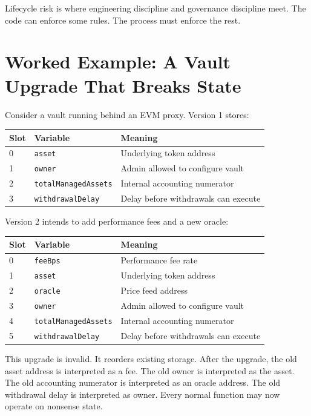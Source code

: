 Lifecycle risk is where engineering discipline and governance discipline meet. The code can enforce some rules. The process must enforce the rest.

\section{Worked Example: A Vault Upgrade That Breaks State}

Consider a vault running behind an EVM proxy. Version 1 stores:

\begin{center}
\begin{tabular}{@{}lll@{}}
\toprule
Slot & Variable & Meaning \\
\midrule
0 & \texttt{asset} & Underlying token address \\
1 & \texttt{owner} & Admin allowed to configure vault \\
2 & \texttt{totalManagedAssets} & Internal accounting numerator \\
3 & \texttt{withdrawalDelay} & Delay before withdrawals can execute \\
\bottomrule
\end{tabular}
\end{center}

Version 2 intends to add performance fees and a new oracle:

\begin{center}
\begin{tabular}{@{}lll@{}}
\toprule
Slot & Variable & Meaning \\
\midrule
0 & \texttt{feeBps} & Performance fee rate \\
1 & \texttt{asset} & Underlying token address \\
2 & \texttt{oracle} & Price feed address \\
3 & \texttt{owner} & Admin allowed to configure vault \\
4 & \texttt{totalManagedAssets} & Internal accounting numerator \\
5 & \texttt{withdrawalDelay} & Delay before withdrawals can execute \\
\bottomrule
\end{tabular}
\end{center}

This upgrade is invalid. It reorders existing storage. After the upgrade, the old asset address is interpreted as a fee. The old owner is interpreted as the asset. The old accounting numerator is interpreted as an oracle address. The old withdrawal delay is interpreted as owner. Every normal function may now operate on nonsense state.

